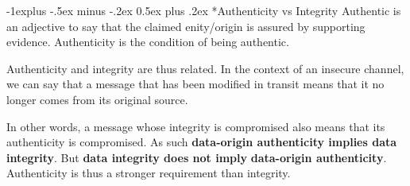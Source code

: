 \documentclass[10pt,landscape]{article}
\makeatletter
\renewcommand{\subsection}{\@startsection{subsection}{2}{0mm}%
                                {-1explus -.5ex minus -.2ex}%
                                {0.5ex plus .2ex}%
                                {\normalfont\normalsize\bfseries}}
\makeatother
\begin{document}
\begin{multicols*}{3}
\subsection*{Authenticity vs Integrity}
Authentic is an adjective to say that the claimed enity/origin is assured by supporting evidence. 
Authenticity is the condition of being authentic. 

Authenticity and integrity are thus related. In the context of an insecure channel, we can say that 
a message that has been modified in transit means that it no longer comes from its original source. 

In other words, a message whose integrity is compromised also means that its authenticity is compromised.
As such \textbf{data-origin authenticity implies data integrity}. But \textbf{data integrity does not imply}
\textbf{data-origin authenticity}. Authenticity is thus a stronger requirement than integrity.


\end{multicols*}
\end{document}
